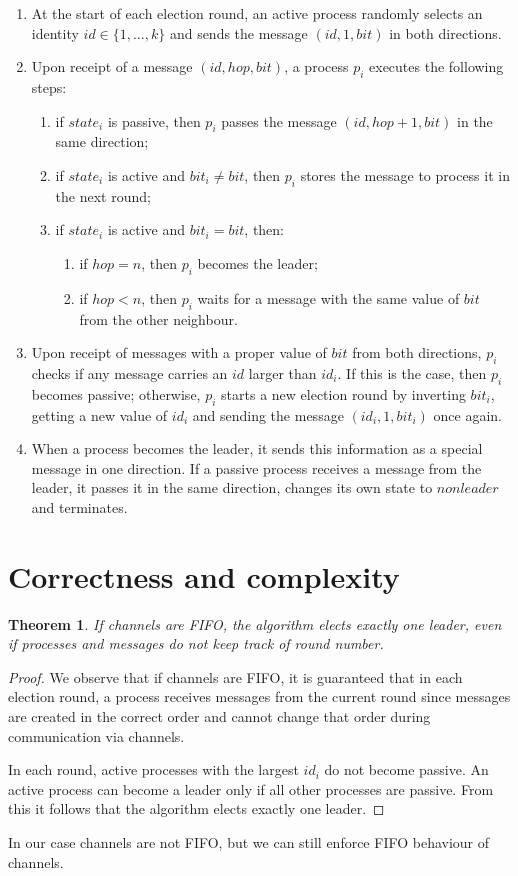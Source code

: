 \documentclass[a4paper,12pt]{article}
\newtheorem{theorem}{Theorem}
\begin{document}
\begin{enumerate}
    \itemsep0em 
    \item At the start of each election round, an active process randomly selects an identity $id \in \{1, \ldots, k\}$ and sends the message $(id, 1, bit)$ in both directions.
    \item Upon receipt of a message $(id, hop, bit)$, a process $p_i$ executes the following steps:
    \begin{enumerate}
        \itemsep0em 
        \item if $state_i$ is passive, then $p_i$ passes the message $(id, hop+1, bit)$ in the same direction;
        \item if $state_i$ is active and $bit_i \not = bit$, then $p_i$ stores the message to process it in the next round;
        \item if $state_i$ is active and $bit_i = bit$, then:
        \begin{enumerate}
            \itemsep0em 
            \item if $hop = n$, then $p_i$ becomes the leader;
            \item if $hop < n$, then $p_i$ waits for a message with the same value of $bit$ from the other neighbour.
        \end{enumerate}
    \end{enumerate}
    \item Upon receipt of messages with a proper value of $bit$ from both directions, $p_i$ checks if any message carries an $id$ larger than $id_i$. If this is the case, then $p_i$ becomes passive; otherwise, $p_i$ starts a new election round by inverting $bit_i$, getting a new value of $id_i$ and sending the message $(id_i, 1, bit_i)$ once again.
    \item When a process becomes the leader, it sends this information as a special message in one direction. If a passive process receives a message from the leader, it passes it in the same direction, changes its own state to $nonleader$ and terminates.
\end{enumerate}


\section{Correctness and complexity}
\begin{theorem}
If channels are FIFO, the algorithm elects exactly one leader, even if processes and messages do not keep track of round number.
\end{theorem}
\begin{proof}
We observe that if channels are FIFO, it is guaranteed that in each election round, a process receives messages from the current round since messages are created in the correct order and cannot change that order during communication via channels.

In each round, active processes with the largest $id_i$ do not become passive. An active process can become a leader only if all other processes are passive. From this it follows that the algorithm elects exactly one leader.
\end{proof}
In our case channels are not FIFO, but we can still enforce FIFO behaviour of channels.
\end{document}
